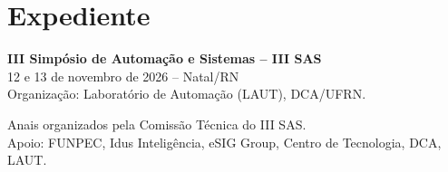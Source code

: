 \documentclass[12pt,a4paper,oneside,openany]{book}
\newcommand{\Autor}[1]{\index[autores]{#1}}
\newcommand{\Artigo}[3]{%
  }
\begin{document}
\Artigo{18_desenvolvimento_de_uma_ferramenta_computacional_em_aplicacao_web_para_simular_o_comportamento_dinamico_do_bombeio_por_cavidades_progressivas_bcp_e_estudar_o_fenomeno_de_reversao_d}
{Desenvolvimento de uma ferramenta computacional em aplicação WEB para simular o comportamento dinâmico do bombeio por cavidades progressivas (BCP) e estudar o fenômeno de reversão do fluxo}
{\Autor{Guilherme da Costa Medeiros Nascimento}, \Autor{André Laurindo Maitelli}, \Autor{Camila Raquel Sena de Almeida}, \Autor{Pedro Manuel Pereira Chamorro}, \Autor{Rutácio de Oliveira Costa} }

\backmatter

\printindex[autores]

\chapter*{Expediente}

\noindent\textbf{III Simpósio de Automação e Sistemas -- III SAS}\\
12 e 13 de novembro de 2026 -- Natal/RN\\
Organização: Laboratório de Automação (LAUT), DCA/UFRN.

\vspace{0.5cm}
\noindent Anais organizados pela Comissão Técnica do III SAS.\\
\noindent Apoio: FUNPEC, Idus Inteligência, eSIG Group, Centro de Tecnologia, DCA, LAUT.
\end{document}
